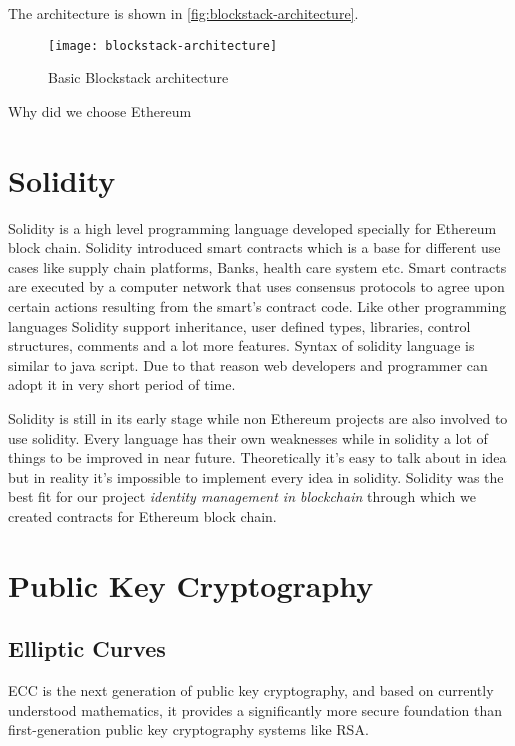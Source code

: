 The architecture is shown in \ref{fig:blockstack-architecture}.
\begin{figure}[h]
	\centering
  \texttt{[image: blockstack-architecture]}
	\caption{Basic Blockstack architecture}
	\label{fig1}
\end{figure}

\begin{notation}
	Why did we choose Ethereum
\end{notation}

\section{Solidity}
Solidity is a high level programming language developed specially for Ethereum block chain. Solidity introduced smart contracts which is a base for different use cases like supply chain platforms, Banks, health care system etc. Smart contracts are executed by a computer network that uses consensus protocols to agree upon certain actions resulting from the smart’s contract code. Like other programming languages Solidity support inheritance, user defined types, libraries, control structures, comments and a lot more features. Syntax of solidity language is similar to java script. Due to that reason web developers and programmer can adopt it in very short period of time.

Solidity is still in its early stage while non Ethereum projects are also involved to use solidity. Every language has their own weaknesses while in solidity a lot of things to be improved in near future. Theoretically it’s easy to talk about in idea but in reality it’s impossible to implement every idea in solidity. Solidity was the best fit for our project \textit{identity management in blockchain} through which we created contracts for Ethereum block chain.

\section{Public Key Cryptography}

\subsection{Elliptic Curves}
ECC is the next generation of public key cryptography, and based on currently understood mathematics, it provides a significantly more secure foundation than first-generation public key cryptography systems like RSA.

